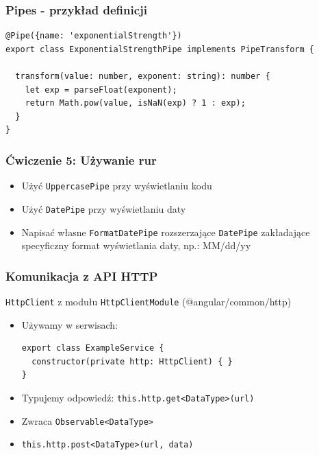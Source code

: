 \documentclass{beamer}
\begin{document}
\begin{frame}[fragile]
    \frametitle{Pipes - przykład definicji}
    \begin{lstlisting}
@Pipe({name: 'exponentialStrength'})
export class ExponentialStrengthPipe implements PipeTransform {

  transform(value: number, exponent: string): number {
    let exp = parseFloat(exponent);
    return Math.pow(value, isNaN(exp) ? 1 : exp);
  }
}
    \end{lstlisting}
\end{frame}

\begin{frame}
    \frametitle{Ćwiczenie 5: Używanie rur}
    \begin{itemize}
        \item Użyć \lstinline{UppercasePipe} przy wyświetlaniu kodu
        \item Użyć \lstinline{DatePipe} przy wyświetlaniu daty
        \item Napisać własne \lstinline{FormatDatePipe} rozszerzające \lstinline{DatePipe} zakładające specyficzny format
            wyświetlania daty, np.: MM/dd/yy
    \end{itemize}
\end{frame}

\begin{frame}[fragile]
    \frametitle{Komunikacja z API HTTP}
    \lstinline{HttpClient} z modułu \lstinline{HttpClientModule} (@angular/common/http)
    \begin{itemize}
        \item Używamy w serwisach:
\begin{lstlisting}
export class ExampleService {
  constructor(private http: HttpClient) { }
}
\end{lstlisting}
        \item Typujemy odpowiedź: \lstinline{this.http.get<DataType>(url)}
        \item Zwraca \lstinline{Observable<DataType>}
        \item \lstinline{this.http.post<DataType>(url, data)}
    \end{itemize}
\end{frame}
\end{document}
